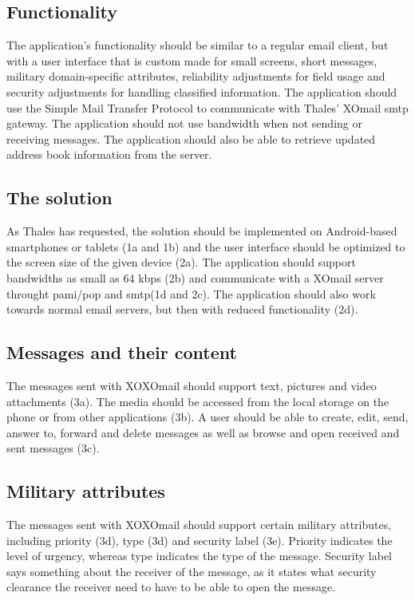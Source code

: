 \subsection{Functionality}
The application's functionality should be similar to a regular email client, but with a user interface that is custom made for small screens, short messages, military domain-specific attributes, reliability adjustments for field usage and security adjustments for handling classified information. The application should use the Simple Mail Transfer Protocol to communicate with Thales' XOmail \gls{smtp} gateway.
\newline
\newline
The application should not use bandwidth when not sending or receiving messages. The application should also be able to retrieve updated address book information from the server.

\subsection{The solution}
As Thales has requested, the solution should be implemented on Android-based smartphones or tablets (1a and 1b) and the user interface should be optimized to the screen size of the given device (2a). The application should support bandwidths as small as 64 kbps (2b) and communicate with a XOmail server throught \gls{pami}/\gls{pop} and \gls{smtp}(1d and 2c). The application should also work towards normal email servers, but then with reduced functionality (2d).

\subsection{Messages and their content}
The messages sent with XOXOmail should support text, pictures and video attachments (3a). The media should be accessed from the local storage on the phone or from other applications (3b). A user should be able to create, edit, send, answer to, forward and delete messages as well as browse and open received and sent messages (3c).

\subsection{Military attributes}
The messages sent with XOXOmail should support certain military attributes, including priority (3d), type (3d) and security label (3e). Priority indicates the level of urgency, whereas type indicates the type of the message. Security label says something about the receiver of the message, as it states what security clearance the receiver need to have to be able to open the message.

